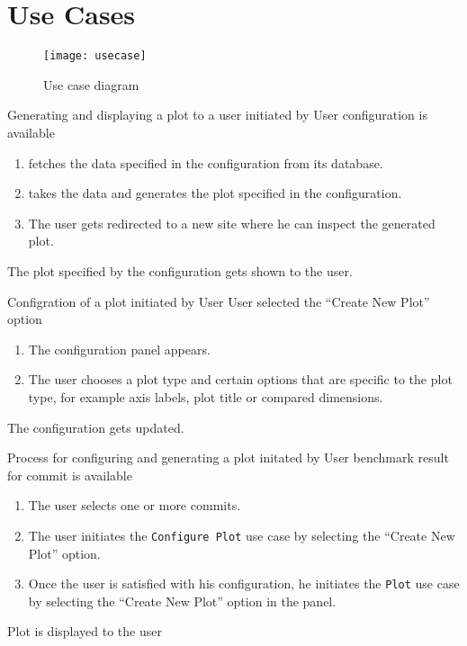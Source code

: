 \section{Use Cases}

\begin{figure}[H]
    \texttt{[image: usecase]}
    \caption{Use case diagram}
    \label{fig:usecase}
\end{figure}

{Generating and displaying a \gls{plot} to a user}
{initiated by User}
{\Gls{configuration} is available}
{\begin{enumerate}
    \item \parkview{} fetches the data specified in the \gls{configuration} from its database.
    \item \parkview{} takes the data and generates the \gls{plot} specified in the \gls{configuration}.
    \item The user gets redirected to a new site where he can inspect the generated \gls{plot}.
\end{enumerate}}
{The \gls{plot} specified by the \gls{configuration} gets shown to the user.}

\bigskip

{Configration of a \gls{plot}}
{initiated by User}
{User selected the \enquote{Create New Plot} option}
{\begin{enumerate}
    \item The configuration panel appears.
    \item The user chooses a \gls{plot type} and certain options that are specific to the \gls{plot type}, for example axis labels, plot title or compared dimensions.
\end{enumerate}}
{The \gls{configuration} gets updated.}

\bigskip

{Process for configuring and generating a plot}
{initated by User}
{\Gls{benchmark result} for commit is available}
{\begin{enumerate}
    \item The user selects one or more commits.
    \item The user initiates the \texttt{Configure Plot} use case by selecting the \enquote{Create New Plot} option.
    \item Once the user is satisfied with his \gls{configuration}, he initiates the \texttt{Plot} use case by selecting the \enquote{Create New Plot} option in the panel.
\end{enumerate}}
{Plot is displayed to the user}

